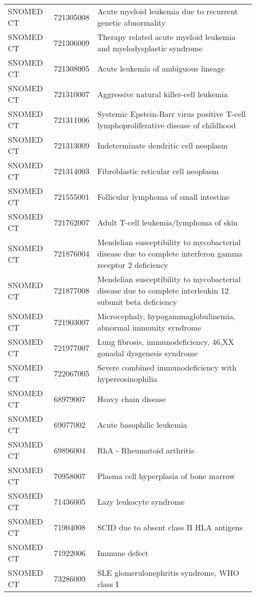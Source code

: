 \begin{longtable}{p{}p{}p{}}
  SNOMED CT & 721305008 & Acute myeloid leukemia due to recurrent genetic abnormality \\ 
  SNOMED CT & 721306009 & Therapy related acute myeloid leukemia and myelodysplastic syndrome \\ 
  SNOMED CT & 721308005 & Acute leukemia of ambiguous lineage \\ 
  SNOMED CT & 721310007 & Aggressive natural killer-cell leukemia \\ 
  SNOMED CT & 721311006 & Systemic Epstein-Barr virus positive T-cell lymphoproliferative disease of childhood \\ 
  SNOMED CT & 721313009 & Indeterminate dendritic cell neoplasm \\ 
  SNOMED CT & 721314003 & Fibroblastic reticular cell neoplasm \\ 
  SNOMED CT & 721555001 & Follicular lymphoma of small intestine \\ 
  SNOMED CT & 721762007 & Adult T-cell leukemia/lymphoma of skin \\ 
  SNOMED CT & 721876004 & Mendelian susceptibility to mycobacterial disease due to complete interferon gamma receptor 2 deficiency \\ 
  SNOMED CT & 721877008 & Mendelian susceptibility to mycobacterial disease due to complete interleukin 12 subunit beta deficiency \\ 
  SNOMED CT & 721903007 & Microcephaly, hypogammaglobulinemia, abnormal immunity syndrome \\ 
  SNOMED CT & 721977007 & Lung fibrosis, immunodeficiency, 46,XX gonadal dysgenesis syndrome \\ 
  SNOMED CT & 722067005 & Severe combined immunodeficiency with hypereosinophilia \\ 
  SNOMED CT & 68979007 & Heavy chain disease \\ 
  SNOMED CT & 69077002 & Acute basophilic leukemia \\ 
  SNOMED CT & 69896004 & RhA - Rheumatoid arthritis \\ 
  SNOMED CT & 70958007 & Plasma cell hyperplasia of bone marrow \\ 
  SNOMED CT & 71436005 & Lazy leukocyte syndrome \\ 
  SNOMED CT & 71904008 & SCID due to absent class II HLA antigens \\ 
  SNOMED CT & 71922006 & Immune defect \\ 
  SNOMED CT & 73286009 & SLE glomerulonephritis syndrome, WHO class I \\ 

\end{longtable}
